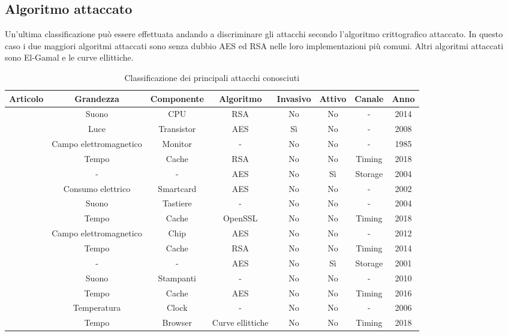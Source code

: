 		\subsection*{Algoritmo attaccato}		
			Un'ultima classificazione può essere effettuata andando a discriminare gli attacchi secondo l'algoritmo crittografico attaccato. In questo caso i due maggiori algoritmi attaccati sono senza dubbio \ac{AES}\cite{standard2001announcing} ed RSA\cite{rivest1978method} nelle loro implementazioni più comuni. Altri algoritmi attaccati sono El-Gamal\cite{elgamal1985public} e le curve ellittiche\cite{koblitz1987elliptic,miller1985use}.
			\begin{table}[]
				\scriptsize
				\centering
				\begin{tabular}{|c|c|c|c|c|c|c|c|} \hline
					Articolo					& Grandezza					& Componente	& Algoritmo			& Invasivo	& Attivo	& Canale	& Anno	\\ \hline \hline
					\cite{genkin2014rsa}		& Suono						& CPU			& RSA				& No		& No		& -			& 2014	\\ \hline
					\cite{ferrigno2008aes}		& Luce						& Transistor	& AES				& Sì		& No		& -			& 2008	\\ \hline
					\cite{van1985electromagn}	& Campo elettromagnetico	& Monitor    	& -					& No		& No		& -			& 1985	\\ \hline
					\cite{kocher2018spectre}	& Tempo						& Cache			& RSA				& No		& No		& Timing	& 2018	\\ \hline
					\cite{giraud2004dfa}		& -							& -				& AES				& No		& Sì		& Storage	& 2004	\\ \hline
					\cite{mangard2002simple}	& Consumo elettrico			& Smartcard		& AES				& No		& No		& -			& 2002	\\ \hline
					\cite{asonov2004keyboard}	& Suono						& Tastiere		& -					& No		& No		& -			& 2004	\\ \hline
					\cite{zhou2018efficient}	& Tempo						& Cache			& OpenSSL			& No		& No		& Timing	& 2018	\\ \hline
					\cite{martinasek2012simple}	& Campo elettromagnetico	& Chip			& AES				& No		& No		& -			& 2012	\\ \hline
					\cite{yarom2014flush+}		& Tempo						& Cache			& RSA				& No		& No		& Timing	& 2014	\\ \hline
					\cite{karri2001fault}		& -							& -				& AES				& No		& Sì		& Storage	& 2001	\\ \hline
					\cite{backes2010acoustic}	& Suono						& Stampanti		& -					& No		& No		& -			& 2010	\\ \hline
					\cite{lipp2016armageddon}	& Tempo						& Cache			& AES				& No		& No		& Timing	& 2016	\\ \hline
					\cite{murdoch2006hot}		& Temperatura				& Clock			& -					& No		& No		& -			& 2006	\\ \hline
					\cite{genkin2018drive}		& Tempo						& Browser		& Curve ellittiche	& No		& No		& Timing	& 2018	\\ \hline
				\end{tabular}
				\caption{Classificazione dei principali attacchi conosciuti}
				\label{tab:attacchi}
			\end{table}
